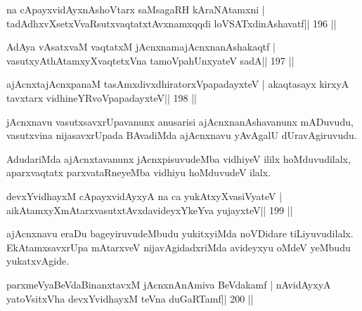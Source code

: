 \begin{shl}
na cApayxvidAyxnAshoV\s tarx saMsagaRH kAraNAtamxni |
tadAdhxvXsetxVvaRsutxvaqtatxtAvxnamxqqdi loVSATxdinAshavatf\hfill || 196 ||
\end{shl}

\begin{shl}
AdAya vAsatxvaM vaqtatxM jAcnxnamajAcnxnanAshakaqtf |
vasutxyAthAtamxyXvaqtetxVna tamoV\s pahUnxyateV sadA\hfill || 197 ||
\end{shl}

\begin{shl}
ajAcnxtajAcnxpanaM tasAmxdivxdhiratorxVpapadayxteV |
akaqtasayx kirxyA tavxtarx vidhineYRvoVpapadayxteV\hfill || 198 ||
\end{shl}

\begin{artha}
jAcnxnavu vasutxsavxrUpavanunx anusarisi ajAcnxnanAshavanunx mADuvudu, vasutx\-vina nijasavxrUpada BAvadiMda ajAcnxnavu yAvAgalU dUravAgiruvudu.
\end{artha}

\begin{artha}
AdudariMda ajAcnxtavanunx jAcnxpisuvudeMba vidhiyeV ililx hoMduvudilalx, aparxvaqtatx parxvataRneyeMba vidhiyu hoMduvudeV ilalx.
\end{artha}


\begin{shl}
\footnotemark[1]devxYvidhayxM cApayxvidAyxyA na ca yukAtxyX\s vasiVyateV |
\footnotemark[2]aikAtamxyXmAtarxvasutxtAvxdavideyxYkeYva yujayxteV\hfill || 199 ||
\end{shl}

\begin{artha}
ajAcnxnavu eraDu bageyiruvudeMbudu yukitxyiMda noVDidare tiLiyuvu\-dilalx. EkAtamxsavxrUpa mAtarxveV nijavAgidadxriMda avideyxyu oMdeV yeMbudu yukatxvAgide.
\end{artha}

\begin{shl}
parxmeVyaBeVdaBinanxtavxM jAcnxnAnAmiva BeVdakamf |
nAvidAyxyA yatoV\s sitxVha devxYvidhayxM teVna duGaRTamf\hfill || 200 ||
\end{shl}

